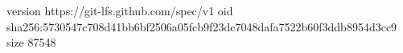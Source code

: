 version https://git-lfs.github.com/spec/v1
oid sha256:5730547c708d41bb6bf2506a05fcb9f23dc7048dafa7522b60f3ddb8954d3cc9
size 87548
